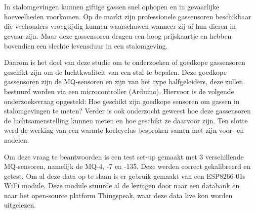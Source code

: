 
%
%
%
%
%




\chapter*{}


In stalomgevingen kunnen giftige gassen snel ophopen en in gevaarlijke hoeveelheden voorkomen. Op de markt zijn professionele gassensoren beschikbaar die veehouders vroegtijdig kunnen waarschuwen wanneer zij of hun dieren in gevaar zijn. Maar deze gassensoren dragen een hoog prijskaartje en hebben bovendien een slechte levensduur in een stalomgeving.

Daarom is het doel van deze studie om te onderzoeken of goedkope gassensoren geschikt zijn om de luchtkwaliteit van een stal te bepalen. Deze goedkope gassensoren zijn de MQ-sensoren en zijn van het type halfgeleiders, deze zullen bestuurd worden via een microcontroller (Arduino). Hiervoor is de volgende onderzoeksvraag opgesteld: Hoe geschikt zijn goedkope sensoren om gassen in stalomgevingen te meten? Verder is ook onderzocht geweest hoe deze gassensoren de luchtsamenstelling kunnen meten en hoe geschikt ze daarvoor zijn. Ten slotte werd de werking van een warmte-koelcyclus besproken samen met zijn voor- en nadelen.

Om deze vraag te beantwoorden is een test set-up gemaakt met 3 verschillende MQ-sensoren, namelijk de MQ-4, -7 en -135. Deze werden correct gekalibreerd en getest. Om al deze data op te slaan is er gebruik gemaakt van een ESP8266-01s WiFi module. Deze module stuurde al de lezingen door naar een databank en naar het open-source platform Thingspeak, waar deze data live kon worden uitgelezen.

